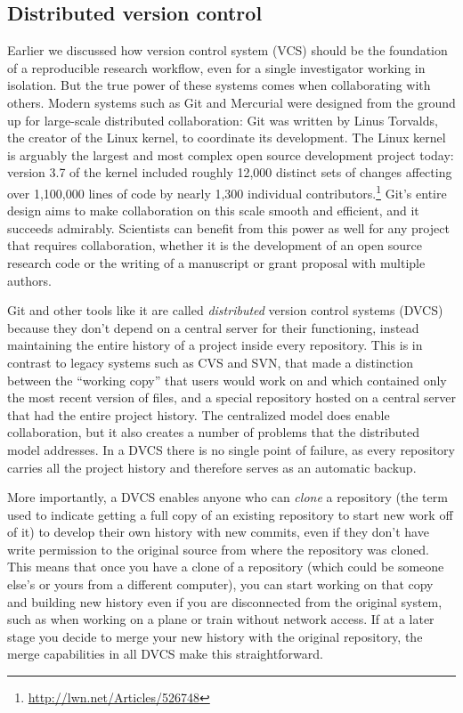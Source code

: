 \documentclass[11pt,oneside,english]{article}
\begin{document}
\subsection{Distributed version control}

Earlier we discussed how version control system (VCS) should be the foundation
of a reproducible research workflow, even for a single investigator working in
isolation.  But the true power of these systems comes when
collaborating with others.  Modern systems such as Git
and Mercurial were designed from the ground up for large-scale distributed
collaboration: Git was written by Linus Torvalds, the creator of the Linux
kernel, to coordinate its development.  The Linux kernel is arguably the
largest and most complex open source development project today: version
3.7 of the kernel included roughly 12,000 distinct sets of changes affecting
over 1,100,000 lines of code by nearly 1,300 individual
contributors.\footnote{\url{http://lwn.net/Articles/526748}}  Git's entire
design aims to make collaboration on this scale smooth and efficient, and it
succeeds admirably.  Scientists can benefit from this power as well
for any project that requires collaboration, whether it is the development of
an open source research code or the writing of a manuscript or grant proposal
with multiple authors.

Git and other tools like it are called \emph{distributed} version control
systems (DVCS) because they don't depend on a central server for their
functioning, instead maintaining the entire history of a project inside every
repository.  This is in contrast to legacy systems such as CVS and SVN, that
made a distinction between the ``working copy'' that users would work on and
which contained only the most recent version of files, and a special repository
hosted on a central server that had the entire project history.  The
centralized model does enable collaboration, but it also creates a number of
problems that the distributed model addresses.  In a DVCS there is no single
point of failure, as every repository carries all the project history and
therefore serves as an automatic backup.

More importantly, a DVCS enables anyone who can \emph{clone} a repository (the
term used to indicate getting a full copy of an existing repository to start
new work off of it) to develop their own history with new commits, even if they
don't have write permission to the original source from where the repository
was cloned.  This means that once you have a clone of a repository (which could
be someone else's or yours from a different computer), you can start working on
that copy and building new history even if you are disconnected from the
original system, such as when working on a plane or train without network
access.  If at a later stage you decide to merge your new history with the
original repository, the merge capabilities in all DVCS make this
straightforward.
\end{document}
